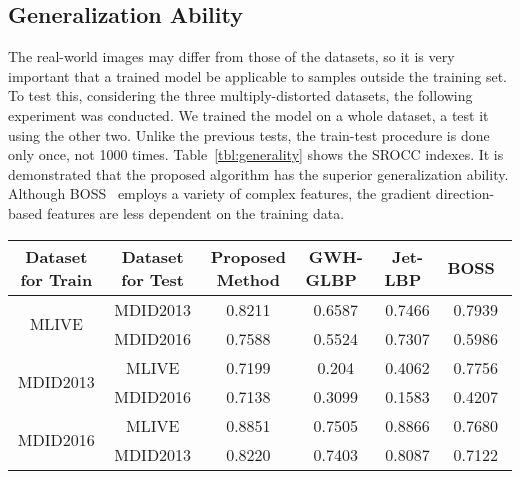 \subsection{Generalization Ability}
The real-world images may differ from those of the datasets, so it is very important that a trained model be applicable to samples outside the training set. To test this, considering the three multiply-distorted datasets, the following experiment was conducted. We trained the model on a whole dataset, a test it using the other two. Unlike the previous tests, the train-test procedure is done only once, not 1000 times. Table~\ref{tbl:generality} shows the SROCC indexes. It is demonstrated that the proposed algorithm has the superior generalization ability. Although BOSS~\cite{Zhou2018} employs a variety of complex features, the gradient direction-based features are less dependent on the training data.
\begin{sidewaystable}[htb]
    \caption{SROCC Indexes for Cross-Dataset Evaluation.}
    \label{tbl:generality}
  \bigskip
    \centering\footnotesize\setlength\tabcolsep{2pt}
        \hspace*{-1cm}\begin{tabular}{c|c||c|c|c|c}
             \textbf{Dataset for Train}&\textbf{Dataset for Test}&Proposed Method&GWH-GLBP~\cite{Li2016}&Jet-LBP~\cite{Hadizadeh2016}&BOSS~\cite{Zhou2018}
             \\
             \hline\hline
             \multirow{2}{4em}{MLIVE}&MDID2013&0.8211&0.6587&0.7466&0.7939\\[1ex]
             &MDID2016&0.7588&0.5524&0.7307&0.5986\\[1ex]
             \hline\hline
             \multirow{2}{4em}{MDID2013}&MLIVE&0.7199&0.204&0.4062&0.7756\\[1ex]
             &MDID2016&0.7138&0.3099&0.1583&0.4207\\[1ex]
             \hline\hline
             \multirow{2}{4em}{MDID2016}&MLIVE&0.8851&0.7505&0.8866&0.7680\\[1ex]
             &MDID2013&0.8220&0.7403&0.8087&0.7122\\[1ex]
             \hline\hline
             
             \end{tabular}\hspace*{-1cm}
\end{sidewaystable}
